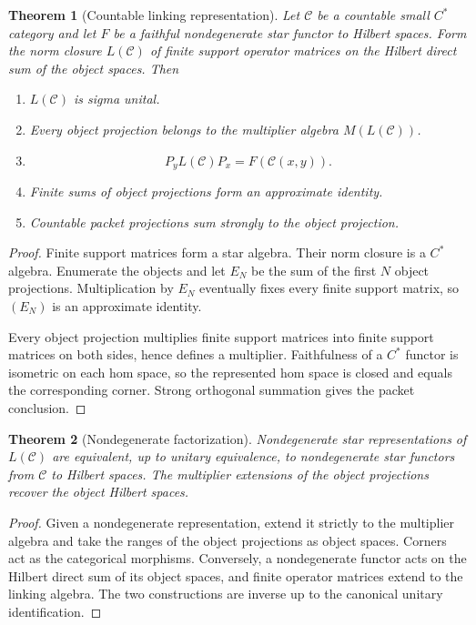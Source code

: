 \documentclass{aomart}
\newtheorem{theorem}{Theorem}[section]
\theoremstyle{definition}
\theoremstyle{remark}
\newcommand{\Ccal}{\mathcal C}
\begin{document}
\begin{theorem}[Countable linking representation]\label{thm:countable_linking}
Let \(\Ccal\) be a countable small \(C^*\) category and let \(F\) be a faithful nondegenerate star functor to Hilbert spaces. Form the norm closure \(L(\Ccal)\) of finite support operator matrices on the Hilbert direct sum of the object spaces. Then
\begin{enumerate}
\item \(L(\Ccal)\) is sigma unital.
\item Every object projection belongs to the multiplier algebra \(M(L(\Ccal))\).
\item
\[
 P_yL(\Ccal)P_x
 =
 F(\Ccal(x,y)).
\]
\item Finite sums of object projections form an approximate identity.
\item Countable packet projections sum strongly to the object projection.
\end{enumerate}
\end{theorem}

\begin{proof}
Finite support matrices form a star algebra. Their norm closure is a \(C^*\) algebra. Enumerate the objects and let \(E_N\) be the sum of the first \(N\) object projections. Multiplication by \(E_N\) eventually fixes every finite support matrix, so \((E_N)\) is an approximate identity.

Every object projection multiplies finite support matrices into finite support matrices on both sides, hence defines a multiplier. Faithfulness of a \(C^*\) functor is isometric on each hom space, so the represented hom space is closed and equals the corresponding corner. Strong orthogonal summation gives the packet conclusion.
\end{proof}

\begin{theorem}[Nondegenerate factorization]\label{thm:nondegenerate_factorization}
Nondegenerate star representations of \(L(\Ccal)\) are equivalent, up to unitary equivalence, to nondegenerate star functors from \(\Ccal\) to Hilbert spaces. The multiplier extensions of the object projections recover the object Hilbert spaces.
\end{theorem}

\begin{proof}
Given a nondegenerate representation, extend it strictly to the multiplier algebra and take the ranges of the object projections as object spaces. Corners act as the categorical morphisms. Conversely, a nondegenerate functor acts on the Hilbert direct sum of its object spaces, and finite operator matrices extend to the linking algebra. The two constructions are inverse up to the canonical unitary identification.
\end{proof}
\end{document}
